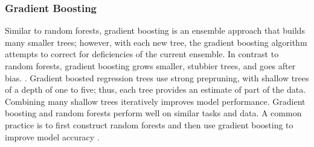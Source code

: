 \documentclass[sigconf]{acmart}
\begin{document}

\subsubsection{Gradient Boosting}

Similar to random forests, gradient boosting is an ensemble approach that 
builds many smaller trees; however, with each new tree, the gradient boosting 
algorithm  attempts to correct for deficiencies of the current ensemble. 
In contrast to random forests, gradient boosting grows smaller, stubbier 
trees, and goes after bias. \cite{jamesetal13, kuhn13}. Gradient boosted 
regression trees use strong prepruning, with shallow trees of a depth of 
one to five; thus, each tree provides an estimate of part of the data. 
Combining many shallow trees iteratively improves model performance. 
Gradient boosting and random forests perform well on similar tasks and data. 
A common practice is to first construct random forests and then use gradient 
boosting to improve model accuracy \cite{muller17}. 

\end{document}
